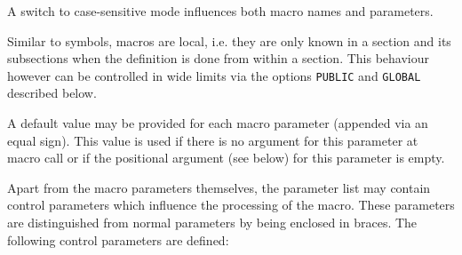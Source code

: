 \documentclass[12pt,twoside]{report}
\newcommand{\tty}[1]{{\tt #1}}
\begin{document}
A switch to case-sensitive mode influences both macro names and
parameters.

Similar to symbols, macros are local, i.e. they are only known in a
section and its subsections when the definition is done from within
a section.  This behaviour however can be controlled in wide limits
via the options \tty{PUBLIC} and \tty{GLOBAL} described below.

A default value may be provided for each macro parameter
(appended via an equal sign).  This value is used if there is no
argument for this parameter at macro call or if the positional
argument (see below) for this parameter is empty.

Apart from the macro parameters themselves, the parameter list may
contain control parameters which influence the processing of the
macro.  These parameters are distinguished from normal parameters by
being enclosed in braces.  The following control parameters are
defined:
\end{document}
